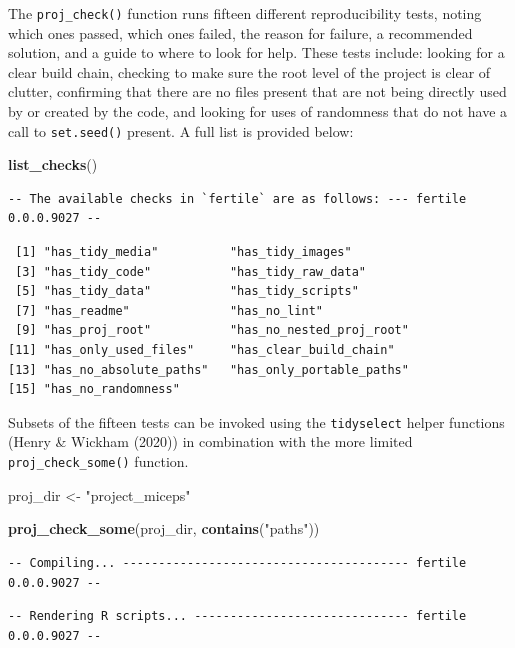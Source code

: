 \documentclass[12pt,twoside]{reedthesis}
\newenvironment{Shaded}{\begin{snugshade}}{\end{snugshade}}
\newcommand{\KeywordTok}[1]{\textcolor[rgb]{0.13,0.29,0.53}{\textbf{#1}}}
\newcommand{\StringTok}[1]{\textcolor[rgb]{0.31,0.60,0.02}{#1}}
\newcommand{\NormalTok}[1]{#1}
\begin{document}
The \texttt{proj\_check()} function runs fifteen different
reproducibility tests, noting which ones passed, which ones failed, the
reason for failure, a recommended solution, and a guide to where to look
for help. These tests include: looking for a clear build chain, checking
to make sure the root level of the project is clear of clutter,
confirming that there are no files present that are not being directly
used by or created by the code, and looking for uses of randomness that
do not have a call to \texttt{set.seed()} present. A full list is
provided below:
\begin{Shaded}
\begin{Highlighting}[]
\KeywordTok{list_checks}\NormalTok{()}
\end{Highlighting}
\end{Shaded}
\begin{verbatim}
-- The available checks in `fertile` are as follows: --- fertile 0.0.0.9027 --
\end{verbatim}
\begin{verbatim}
 [1] "has_tidy_media"          "has_tidy_images"        
 [3] "has_tidy_code"           "has_tidy_raw_data"      
 [5] "has_tidy_data"           "has_tidy_scripts"       
 [7] "has_readme"              "has_no_lint"            
 [9] "has_proj_root"           "has_no_nested_proj_root"
[11] "has_only_used_files"     "has_clear_build_chain"  
[13] "has_no_absolute_paths"   "has_only_portable_paths"
[15] "has_no_randomness"      
\end{verbatim}
Subsets of the fifteen tests can be invoked using the
\texttt{tidyselect} helper functions (Henry \& Wickham (2020)) in
combination with the more limited \texttt{proj\_check\_some()} function.
\begin{Shaded}
\begin{Highlighting}[]
\NormalTok{proj_dir <-}\StringTok{ "project_miceps"}
\end{Highlighting}
\end{Shaded}
\begin{Shaded}
\begin{Highlighting}[]
\KeywordTok{proj_check_some}\NormalTok{(proj_dir, }\KeywordTok{contains}\NormalTok{(}\StringTok{"paths"}\NormalTok{))}
\end{Highlighting}
\end{Shaded}
\begin{verbatim}
-- Compiling... ---------------------------------------- fertile 0.0.0.9027 --
\end{verbatim}
\begin{verbatim}
-- Rendering R scripts... ------------------------------ fertile 0.0.0.9027 --
\end{verbatim}
\end{document}
